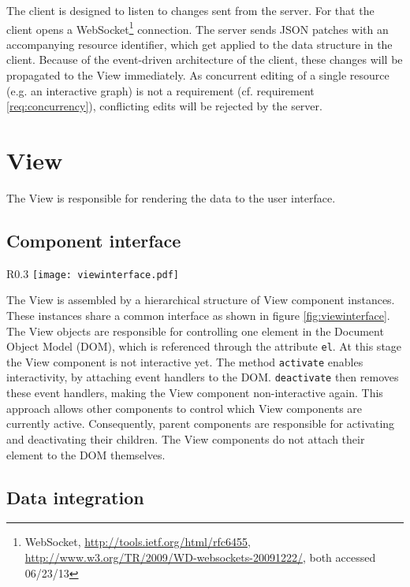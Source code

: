 The client is designed to listen to changes sent from the server. For that the client opens a WebSocket\footnote{WebSocket, \url{http://tools.ietf.org/html/rfc6455}, \url{http://www.w3.org/TR/2009/WD-websockets-20091222/}, both accessed 06/23/13} connection. The server sends JSON patches with an accompanying resource identifier, which get applied to the data structure in the client. Because of the event-driven architecture of the client, these changes will be propagated to the View immediately. As concurrent editing of a single resource (e.g. an interactive graph) is not a requirement (cf. requirement \ref{req:concurrency}), conflicting edits will be rejected by the server.

\section{View}

The View is responsible for rendering the data to the user interface. 

\subsection{Component interface}

\begin{wrapfigure}{R}{0.3\textwidth}
\texttt{[image: viewinterface.pdf]}
\caption{Class diagram of the View component interface}
\label{fig:viewinterface}
\end{wrapfigure}

The View is assembled by a hierarchical structure of View component instances. These instances share a common interface as shown in figure \ref{fig:viewinterface}. The View objects are responsible for controlling one element in the Document Object Model (DOM), which is referenced through the attribute \texttt{el}. At this stage the View component is not interactive yet. The method \texttt{activate} enables interactivity, by attaching event handlers to the DOM. \texttt{deactivate} then removes these event handlers, making the View component non-interactive again. This approach allows other components to control which View components are currently active. Consequently, parent components are responsible for activating and deactivating their children. The View components do not attach their element to the DOM themselves.

\subsection{Data integration}

